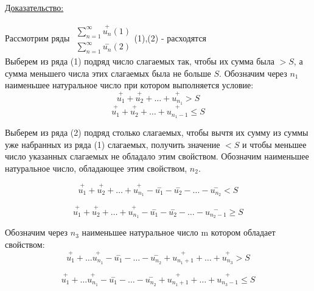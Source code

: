 \documentclass[12pt]{article}
\let\oldsum\sum
\renewcommand{\sum}{\oldsum\limits}
\begin{document}
  \underline{Доказательство:}
    \begin{adjustwidth}{1.5em}{1.5em}

    Рассмотрим ряды
    $
    \begin{matrix}
      \sum_{n=1}^{\infty} \overset{+}{u_n}(1)\\
      \sum_{n=1}^{\infty} \overset{-}{u_n}(2)
    \end{matrix}
    $(1),(2) - расходятся\\
    Выберем из ряда (1) подряд число слагаемых так, чтобы их сумма была $> S$, а сумма меньшего числа
    этих слагаемых была не больше $S$. Обозначим через $n_1$ наименьшее натуральное число при котором
    выполняется условие:
    \[\overset{+}{u_1}+\overset{+}{u_2}+\dots+\overset{+}{u_{n_1}} > S\]
    \[\overset{+}{u_1}+\overset{+}{u_2}+\dots+\overset{+}{u_{n_1-1}} \leq S\]

    Выберем из ряда (2) подряд столько слагаемых, чтобы вычтя их сумму из суммы уже набранных из ряда
    (1) слагаемых, получить значение $<S$ и чтобы меньшее число указанных слагаемых не обладало
    этим свойством. Обозначим наименьшее натуральное число, обладающее этим свойством, $n_2$.

    \[\overset{+}{u_1}+\overset{+}{u_2}+\dots+\overset{+}{u_{n_1}}-\overset{-}{u_1}-\overset{-}{u_2}-\dots-\overset{-}{u_{n_2}}<S\]

    \[\overset{+}{u_1}+\overset{+}{u_2}+\dots+\overset{+}{u_{n_1}}-\overset{-}{u_1}-\overset{-}{u_2}-\dots-\overset{-}{u_{n_2-1}} \geq S\]

    Обозначим через $n_3$ наименьшее натуральное число m котором обладает свойством:
    \[\overset{+}{u_1}+\dots\overset{+}{u_{n_1}}-\overset{-}{u_1}-\dots -\overset{-}{u_{n_2}}+\overset{+}{u_{n_1+1}}+\dots+\overset{+}{u_{n_3}} > S\]

    \[\overset{+}{u_1}+\dots\overset{+}{u_{n_1}}-\overset{-}{u_1}-\dots -\overset{-}{u_{n_2}}+\overset{+}{u_{n_1+1}}+\dots+\overset{+}{u_{n_3-1}} \leq S\]


\end{adjustwidth}
\end{document}
